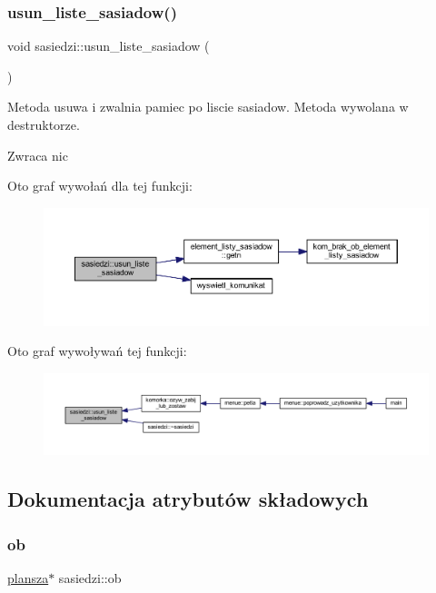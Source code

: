 \subsubsection{\texorpdfstring{usun\+\_\+liste\+\_\+sasiadow()}{usun\_liste\_sasiadow()}}
{\footnotesize\ttfamily void sasiedzi\+::usun\+\_\+liste\+\_\+sasiadow (\begin{DoxyParamCaption}{ }\end{DoxyParamCaption})}

Metoda usuwa i zwalnia pamiec po liscie sasiadow. Metoda wywolana w destruktorze. \begin{DoxyReturn}{Zwraca}
nic 
\end{DoxyReturn}
Oto graf wywołań dla tej funkcji\+:
\nopagebreak
\begin{figure}[H]
\begin{center}
\leavevmode
\includegraphics[width=350pt]{classsasiedzi_a10de1cc6691650a783a289b17f0769ce_cgraph}
\end{center}
\end{figure}
Oto graf wywoływań tej funkcji\+:
\nopagebreak
\begin{figure}[H]
\begin{center}
\leavevmode
\includegraphics[width=350pt]{classsasiedzi_a10de1cc6691650a783a289b17f0769ce_icgraph}
\end{center}
\end{figure}


\subsection{Dokumentacja atrybutów składowych}
\mbox{\label{classsasiedzi_ad77b7ebc8a7e745a1ecd0bc54a917ad8}} 
\subsubsection{\texorpdfstring{ob}{ob}}
{\footnotesize\ttfamily \mbox{\hyperlink{classplansza}{plansza}}$\ast$ sasiedzi\+::ob}

